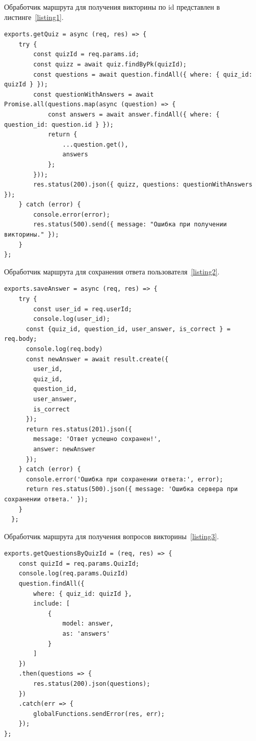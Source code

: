 \documentclass[14pt]{extarticle} %
\begin{document}
Обработчик маршрута для получения викторины по id представлен в листинге~\ref{listing1}.
\begin{lstlisting}[caption={Получение викторины по id}, label=listing1]
exports.getQuiz = async (req, res) => {
    try {
        const quizId = req.params.id;
        const quizz = await quiz.findByPk(quizId);
        const questions = await question.findAll({ where: { quiz_id: quizId } });
        const questionWithAnswers = await Promise.all(questions.map(async (question) => {
            const answers = await answer.findAll({ where: { question_id: question.id } });
            return {
                ...question.get(),
                answers
            };
        }));
        res.status(200).json({ quizz, questions: questionWithAnswers });
    } catch (error) {
        console.error(error);
        res.status(500).send({ message: "Ошибка при получении викторины." });
    }
};
\end{lstlisting} 


Обработчик маршрута для сохранения ответа пользователя~\ref{listing2}.
\begin{lstlisting}[caption={сохранение ответа пользователя}, label=listing2]
exports.saveAnswer = async (req, res) => {
    try {
        const user_id = req.userId;
        console.log(user_id);
      const {quiz_id, question_id, user_answer, is_correct } = req.body;
      console.log(req.body)        
      const newAnswer = await result.create({
        user_id,
        quiz_id,
        question_id,
        user_answer,
        is_correct
      });  
      return res.status(201).json({
        message: 'Ответ успешно сохранен!',
        answer: newAnswer
      });
    } catch (error) {
      console.error('Ошибка при сохранении ответа:', error);
      return res.status(500).json({ message: 'Ошибка сервера при сохранении ответа.' });
    }
  };
\end{lstlisting} 

Обработчик маршрута для получения вопросов викторины~\ref{listing3}.
\begin{lstlisting}[caption={сохранение ответа пользователя}, label=listing3]
exports.getQuestionsByQuizId = (req, res) => {
    const quizId = req.params.QuizId;
    console.log(req.params.QuizId)
    question.findAll({
        where: { quiz_id: quizId },
        include: [
            {
                model: answer,
                as: 'answers'
            }
        ]
    })
    .then(questions => {
        res.status(200).json(questions);
    })
    .catch(err => {
        globalFunctions.sendError(res, err);
    });
};
\end{lstlisting} 
\end{document}
